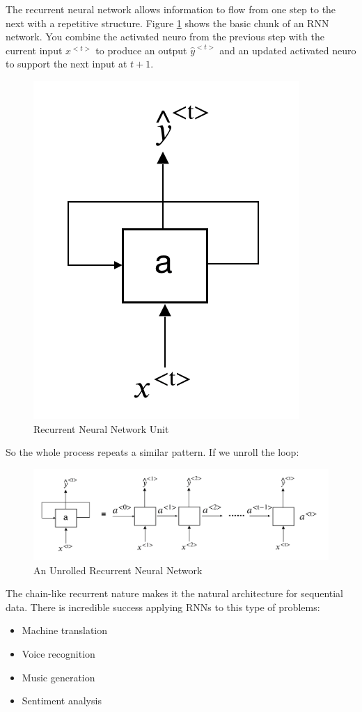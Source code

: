 \documentclass[
  12pt,
]{krantz}
\providecommand{\tightlist}{%
  \setlength{\itemsep}{0pt}\setlength{\parskip}{0pt}}
\begin{document}
The recurrent neural network allows information to flow from one step to the next with a repetitive structure. Figure \ref{fig:rnnunit} shows the basic chunk of an RNN network. You combine the activated neuro from the previous step with the current input \(x^{<t>}\) to produce an output \(\hat{y}^{<t>}\) and an updated activated neuro to support the next input at \(t+1\).

\begin{figure}

{\centering \includegraphics[width=0.4\linewidth]{images/rnnunit} 

}

\caption{Recurrent Neural Network Unit}\label{fig:rnnunit}
\end{figure}

So the whole process repeats a similar pattern. If we unroll the loop:

\begin{figure}

{\centering \includegraphics[width=0.9\linewidth]{images/rnnrollout} 

}

\caption{An Unrolled Recurrent Neural Network}\label{fig:unrolledrnn}
\end{figure}

The chain-like recurrent nature makes it the natural architecture for sequential data. There is incredible success applying RNNs to this type of problems:

\begin{itemize}
\tightlist
\item
  Machine translation
\item
  Voice recognition
\item
  Music generation
\item
  Sentiment analysis
\end{itemize}
\end{document}
